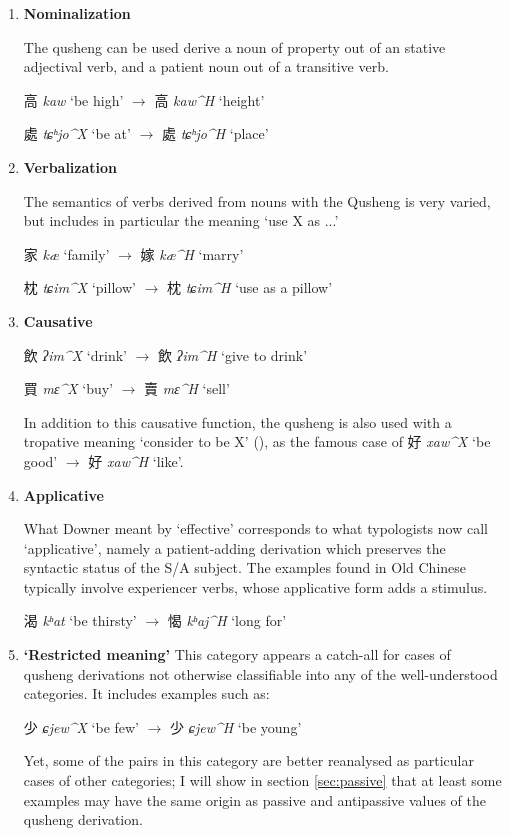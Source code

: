 \documentclass[oneside,a4paper,11pt]{article}
\newcommand{\ipa}[1]{{\phon\textit{\mbox{#1}}}}
\newcommand{\zh}[1]{{\cn#1}}
\newcommand{\ch}[3]{\zh{#1} \ipa{#2} `#3'}
\begin{document}
\begin{enumerate}
\item \textbf{Nominalization}

The qusheng can be used derive a noun of property out of an stative adjectival verb, and a patient noun out of a transitive verb.

\ch{高}{kaw}{be high} $\rightarrow$ \ch{高}{kaw^H}{height} 

\ch{處}{tɕʰjo^X}{be at} $\rightarrow$ \ch{處}{tɕʰjo^H}{place} 

\item \textbf{Verbalization} 

The semantics of verbs derived from nouns with the Qusheng is very varied, but includes in particular the meaning `use X as ...'

\ch{家}{kæ}{family} $\rightarrow$ \ch{嫁}{kæ^H}{marry} 

\ch{枕}{tɕim^X}{pillow} $\rightarrow$ \ch{枕}{tɕim^H}{use as a pillow} 

\item \textbf{Causative}

\ch{飲}{ʔim^X}{drink} $\rightarrow$ \ch{飲}{ʔim^H}{give to drink} 

\ch{買}{mɛ^X}{buy} $\rightarrow$ \ch{賣}{mɛ^H}{sell} 

In addition to this causative function, the qusheng is also used with a tropative meaning `consider to be X' (\citealt{jacques13tropative}), as the famous case of \ch{好}{xaw^X}{be good} $\rightarrow$ \ch{好}{xaw^H}{like}.

\item \textbf{Applicative} 

What Downer meant by `effective' corresponds to what typologists now call `applicative', namely a patient-adding derivation which preserves the syntactic status of the S/A subject. The examples found in Old Chinese typically involve experiencer verbs, whose applicative form adds a stimulus.

\ch{渴}{kʰat}{be thirsty} $\rightarrow$ \ch{愒}{kʰaj^H}{long for} 

\item \textbf{`Restricted meaning'}
This category appears a catch-all for cases of qusheng derivations not otherwise classifiable into any of the well-understood categories. It includes examples such as:

\ch{少}{ɕjew^X}{be few} $\rightarrow$ \ch{少}{ɕjew^H}{be young} 

Yet, some of the pairs in this category are better reanalysed as particular cases of other categories; I will show in section \ref{sec:passive} that at least some examples may have the same origin as passive and antipassive values of the qusheng derivation.


\end{enumerate}
\end{document}
